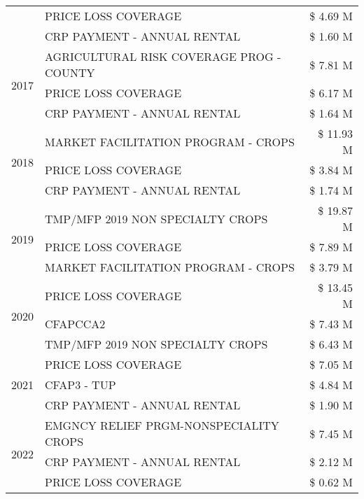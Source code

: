 \begin{tabular}{llr}
 & PRICE LOSS COVERAGE & \$ 4.69 M \\
 & CRP PAYMENT - ANNUAL RENTAL & \$ 1.60 M \\
\cline{1-3}
\multirow[t]{3}{*}{2017} & AGRICULTURAL RISK COVERAGE PROG - COUNTY & \$ 7.81 M \\
 & PRICE LOSS COVERAGE & \$ 6.17 M \\
 & CRP PAYMENT - ANNUAL RENTAL & \$ 1.64 M \\
\cline{1-3}
\multirow[t]{3}{*}{2018} & MARKET FACILITATION PROGRAM - CROPS & \$ 11.93 M \\
 & PRICE LOSS COVERAGE & \$ 3.84 M \\
 & CRP PAYMENT - ANNUAL RENTAL & \$ 1.74 M \\
\cline{1-3}
\multirow[t]{3}{*}{2019} & TMP/MFP 2019 NON SPECIALTY CROPS & \$ 19.87 M \\
 & PRICE LOSS COVERAGE & \$ 7.89 M \\
 & MARKET FACILITATION PROGRAM - CROPS & \$ 3.79 M \\
\cline{1-3}
\multirow[t]{3}{*}{2020} & PRICE LOSS COVERAGE & \$ 13.45 M \\
 & CFAPCCA2 & \$ 7.43 M \\
 & TMP/MFP 2019 NON SPECIALTY CROPS & \$ 6.43 M \\
\cline{1-3}
\multirow[t]{3}{*}{2021} & PRICE LOSS COVERAGE & \$ 7.05 M \\
 & CFAP3 - TUP & \$ 4.84 M \\
 & CRP PAYMENT - ANNUAL RENTAL & \$ 1.90 M \\
\cline{1-3}
\multirow[t]{3}{*}{2022} & EMGNCY RELIEF PRGM-NONSPECIALITY CROPS & \$ 7.45 M \\
 & CRP PAYMENT - ANNUAL RENTAL & \$ 2.12 M \\
 & PRICE LOSS COVERAGE & \$ 0.62 M \\
\cline{1-3}
\bottomrule
\end{tabular}
